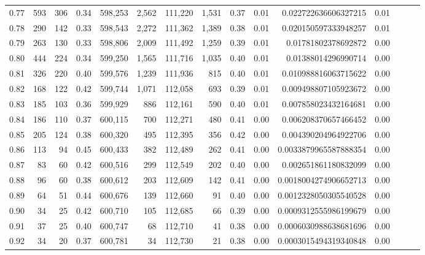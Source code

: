 \begin{tabular}{rrrrrrrrrrrrrrr}
0.77 &     593 &    306 &  0.34 &  598,253 &    2,562 &  111,220 &    1,531 &  0.37 &  0.01 &    0.022722636606327215 &      0.01 \\
0.78 &     290 &    142 &  0.33 &  598,543 &    2,272 &  111,362 &    1,389 &  0.38 &  0.01 &    0.020150597333948257 &      0.01 \\
0.79 &     263 &    130 &  0.33 &  598,806 &    2,009 &  111,492 &    1,259 &  0.39 &  0.01 &     0.01781802378692872 &      0.00 \\
0.80 &     444 &    224 &  0.34 &  599,250 &    1,565 &  111,716 &    1,035 &  0.40 &  0.01 &     0.01388014296990714 &      0.00 \\
0.81 &     326 &    220 &  0.40 &  599,576 &    1,239 &  111,936 &      815 &  0.40 &  0.01 &    0.010988816063715622 &      0.00 \\
0.82 &     168 &    122 &  0.42 &  599,744 &    1,071 &  112,058 &      693 &  0.39 &  0.01 &    0.009498807105923672 &      0.00 \\
0.83 &     185 &    103 &  0.36 &  599,929 &      886 &  112,161 &      590 &  0.40 &  0.01 &    0.007858023432164681 &      0.00 \\
0.84 &     186 &    110 &  0.37 &  600,115 &      700 &  112,271 &      480 &  0.41 &  0.00 &    0.006208370657466452 &      0.00 \\
0.85 &     205 &    124 &  0.38 &  600,320 &      495 &  112,395 &      356 &  0.42 &  0.00 &    0.004390204964922706 &      0.00 \\
0.86 &     113 &     94 &  0.45 &  600,433 &      382 &  112,489 &      262 &  0.41 &  0.00 &   0.0033879965587888354 &      0.00 \\
0.87 &      83 &     60 &  0.42 &  600,516 &      299 &  112,549 &      202 &  0.40 &  0.00 &    0.002651861180832099 &      0.00 \\
0.88 &      96 &     60 &  0.38 &  600,612 &      203 &  112,609 &      142 &  0.41 &  0.00 &   0.0018004274906652713 &      0.00 \\
0.89 &      64 &     51 &  0.44 &  600,676 &      139 &  112,660 &       91 &  0.40 &  0.00 &   0.0012328050305540528 &      0.00 \\
0.90 &      34 &     25 &  0.42 &  600,710 &      105 &  112,685 &       66 &  0.39 &  0.00 &   0.0009312555986199679 &      0.00 \\
0.91 &      37 &     25 &  0.40 &  600,747 &       68 &  112,710 &       41 &  0.38 &  0.00 &   0.0006030988638681696 &      0.00 \\
0.92 &      34 &     20 &  0.37 &  600,781 &       34 &  112,730 &       21 &  0.38 &  0.00 &   0.0003015494319340848 &      0.00 \\

\end{tabular}
